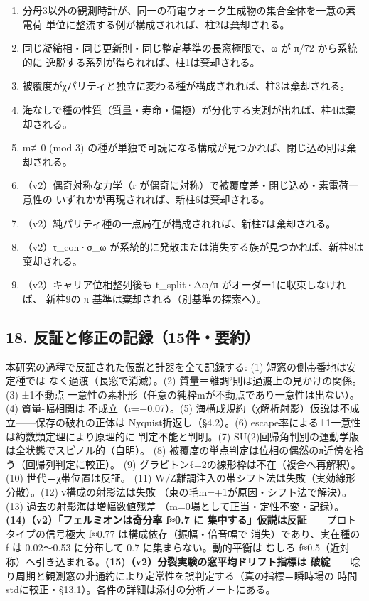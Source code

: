 \documentclass[
]{ltjarticle}
\providecommand{\tightlist}{%
  \setlength{\itemsep}{0pt}\setlength{\parskip}{0pt}}
\begin{document}
\begin{enumerate}
\def\labelenumi{\arabic{enumi}.}
\tightlist
\item
  分母3以外の観測時計が、同一の荷電ウォーク生成物の集合全体を一意の素電荷
  単位に整流する例が構成されれば、柱2は棄却される。
\item
  同じ凝縮相・同じ更新則・同じ整定基準の長窓極限で、ω が π/72
  から系統的に 逸脱する系列が得られれば、柱1は棄却される。
\item
  被覆度がχパリティと独立に変わる種が構成されれば、柱3は棄却される。
\item
  海なしで種の性質（質量・寿命・偏極）が分化する実測が出れば、柱4は棄却される。
\item
  m≢0 (mod 3)
  の種が単独で可読になる構成が見つかれば、閉じ込め則は棄却される。
\item
  （v2）偶奇対称な力学（r
  が偶奇に対称）で被覆度差・閉じ込め・素電荷一意性の
  いずれかが再現されれば、新柱6は棄却される。
\item
  （v2）純パリティ種の一点局在が構成されれば、新柱7は棄却される。
\item
  （v2）τ\_coh·σ\_ω
  が系統的に発散または消失する族が見つかれば、新柱8は棄却される。
\item
  （v2）キャリア位相整列後も t\_split·Δω/π がオーダー1に収束しなければ、
  新柱9の π 基準は棄却される（別基準の探索へ）。
\end{enumerate}

\subsection{18.
反証と修正の記録（15件・要約）}\label{ux53cdux8a3cux3068ux4feeux6b63ux306eux8a18ux933215ux4ef6ux8981ux7d04}

本研究の過程で反証された仮説と計器を全て記録する: (1)
短窓の側帯番地は安定種では なく過渡（長窓で消滅）。(2)
質量＝離調²則は過渡上の見かけの関係。(3) ±1不動点
一意性の素朴形（任意の純粋mが不動点であり一意性は出ない）。(4)
質量-幅相関は 不成立（r=−0.07）。(5)
海構成規約（χ解析射影）仮説は不成立------保存の破れの正体は
Nyquist折返し（§4.2）。(6)
escape率による±1一意性は約数類定理により原理的に 判定不能と判明。(7)
SU(2)回帰角判別の運動学版は全状態でスピノル的（自明）。 (8)
被覆度の単点判定は位相の偶然のπ近傍を拾う（回帰列判定に較正）。 (9)
グラビトンℓ=2の線形枠は不在（複合へ再解釈）。(10) 世代＝χ帯位置は反証。
(11) W/Z離調注入の帯シフト法は失敗（実効線形分散）。(12)
ν構成の射影法は失敗 （束の毛m=+1が原因・シフト法で解決）。(13)
過去の射影海は増幅数値残差
（m=0場として正当・定性不変・記録）。\textbf{(14)（v2）「フェルミオンは奇分率
f≈0.7 に 集中する」仮説は反証}------プロトタイプの信号極大 f≈0.77
は構成依存（振幅・倍音幅で 消失）であり、実在種の f は 0.02〜0.53
に分布して 0.7 に集まらない。動的平衡は むしろ
f≈0.5（近対称）へ引き込まれる。\textbf{(15)（v2）分裂実験の窓平均ドリフト指標は
破綻}------唸り周期と観測窓の非通約により定常性を誤判定する（真の指標＝瞬時場の
時間stdに較正・§13.1）。各件の詳細は添付の分析ノートにある。
\end{document}
